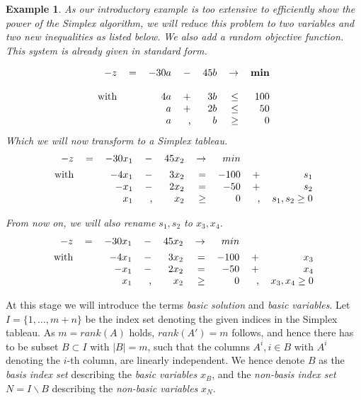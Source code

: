 \documentclass[a4paper, 11pt]{article}
\newtheorem{example}{Example}
\begin{document}
\begin{example}
	As our introductory example is too extensive to efficiently show the power of the Simplex algorithm, we will reduce this problem to two variables and two new inequalities as listed below. We also add a random objective function. This system is already given in standard form.\medskip
	
	\begin{equation}
		\begin{tabular}{rrrrrrr}
			$ -z $&$=$& $-30a$ &$- $&$45b$ &$\rightarrow$& $\textbf{min}$ \\
			\\
			with&&$4a$ &$+$&$3b$&$\leq$&$100$\\
			&&$a$ & $+$&$2b$&$\leq$&$50$\\
			&&$a$ & ,&$b$ &$\geq$&$0$
		\end{tabular}
	\end{equation}
	Which we will now transform to a Simplex tableau.
	\begin{equation}
		\begin{tabular}{rrrrrrrrr}
			$ -z $&$=$& $-30x_1$ &$-$&$45x_2$ &$\rightarrow$& \textbf{$min$}&& \vspace{0.15cm}\\
			with &&$-4x_1$ &$-$&$3x_2$&$=$&$-100$&$+$&$s_1$\\
			&&$-x_1$ & $-$&$2x_2$&$=$&$-50$&$+$&$s_2$\\
			&&$x_1$ &, &$x_2$&$\geq$&$0$ &,&$s_1, s_2 \geq 0$
		\end{tabular}
	\end{equation}

	From now on, we will also rename $s_1,s_2$ to $x_3, x_4$.
	\begin{equation}
		\begin{tabular}{rrrrrrrrr}
			$ -z $&$=$& $-30x_1$ &$-$&$45x_2$ &$\rightarrow$& \textbf{$min$}&& \vspace{0.15cm}\\
			with &&$-4x_1$ &$-$&$3x_2$&$=$&$-100$&$+$&$x_3$\\
			&&$-x_1$ & $-$&$2x_2$&$=$&$-50$&$+$&$x_4$\\
			&&$x_1$ &, &$x_2$&$\geq$&$0$ &,&$x_3, x_4 \geq 0$
		\end{tabular}
	\end{equation}
\end{example}

At this stage we will introduce the terms \textit{basic solution} and \textit{basic variables}. Let $I=\{1,\dots,m+n\}$ be the index set denoting the given indices in the Simplex tableau. As $m=rank(A)$ holds, $rank(A')=m$ follows, and hence there has to be subset $B \subset I$ with $|B| = m$, such that the columns $A^i, i\in B$ with $A^i$ denoting the $i$-th column, are linearly independent. We hence denote $B$ as the \textit{basis index set} describing the \textit{basic variables} $x_B$, and the \textit{non-basis index set} $N=I\backslash B$ describing the \textit{non-basic variables} $x_N$.\medskip
\end{document}
